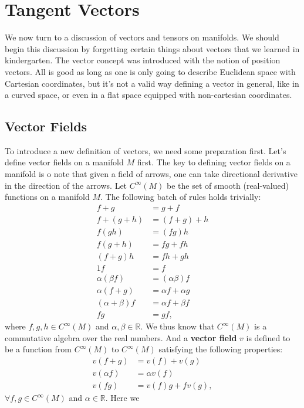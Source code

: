\documentclass[a4paper,11pt]{article}
\theoremstyle{remark}
\begin{document}
\section{Tangent Vectors}
\label{s:VT}
We now turn to a discussion of vectors and tensors on manifolds. We
should begin this discussion by forgetting certain things about
vectors that we learned in kindergarten. The vector concept was
introduced with the notion of position vectors. All is good as long as
one is only going to describe Euclidean space with Cartesian
coordinates, but it's not a valid way defining a vector in general,
like in a curved space, or even in a flat space equipped with
non-cartesian coordinates.
\subsection{Vector Fields}
\label{sub:vefi}
To introduce a new definition of vectors, we need some preparation
first. Let's define vector fields on a manifold $M$ first. The key to
defining vector fields on a manifold is o note that given a field of
arrows, one can take directional derivative in the direction of the
arrows. Let $C^{\infty}(M)$ be the set of smooth (real-valued)
functions on a manifold $M$. The following batch of rules holds
trivially:
\begin{align*}
  f +g &= g+f\\
  f+(g+h)&=(f+g)+h\\
  f(g h)&=(f g)h\\
  f(g+h)&=f g+f h\\
  (f+g)h&=f h+g h\\
  1 f &= f\\
  \alpha( \beta f) &= ( \alpha \beta ) f \\
  \alpha(f+g) &= \alpha f+ \alpha g \\
  ( \alpha + \beta )f &= \alpha f + \beta f \\
  f g &=g f,
\end{align*}
where $f, g, h \in C^{\infty}(M)$ and $\alpha, \beta \in \mathbb{R}$.
We thus know that $C^{\infty}(M)$ is a commutative algebra over the
real numbers. And a \textbf{vector field} $v$ is defined to be a
function from $C^{\infty}(M)$ to $C^{\infty}(M)$ satisfying the
following properties:
\begin{align*}
  v(f+g)&=v(f)+v(g)\\
  v(\alpha f)&=\alpha v(f)\\
  v(f g)&=v(f) g+f v(g),
\end{align*}
$\forall f, g \in C^{\infty}(M)$ and $\alpha \in \mathbb{R}$. Here we
\end{document}
